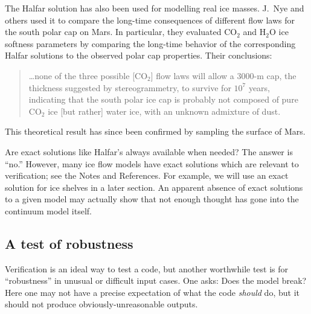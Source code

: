 \documentclass[letterpaper,final,12pt,reqno]{amsart}
\begin{document}
The Halfar solution has also been used for modelling real ice masses.  J.~Nye and others \cite{NyeIcarus2000} used it to compare the long-time consequences of different flow laws for the south polar cap on Mars.  In particular, they evaluated $\text{CO}_2$ and $\text{H}_2\text{O}$ ice softness parameters by comparing the long-time behavior of the corresponding Halfar solutions to the observed polar cap properties.  Their conclusions:
  \begin{quote}
  \dots none of the three possible [$\text{CO}_2$] flow laws will allow a 3000-m cap, the thickness suggested by stereogrammetry, to survive for $10^7$ years, indicating that the south polar ice cap is probably not composed of pure $\text{CO}_2$ ice [but rather] water ice, with an unknown admixture of dust.
  \end{quote}
This theoretical result has since been confirmed by sampling the surface of Mars.

Are exact solutions like Halfar's always available when needed?  The answer is ``no.''  However, many ice flow models have exact solutions which are relevant to verification; see the Notes and References.  For example, we will use an exact solution for ice shelves in a later section.  An apparent absence of exact solutions to a given model may actually show that not enough thought has gone into the continuum model itself.

\subsection*{A test of robustness}  Verification is an ideal way to test a code, but another worthwhile test is for ``robustness'' in unusual or difficult input cases.  One asks: Does the model break?  Here one may not have a precise expectation of what the code \emph{should} do, but it should not produce obviously-unreasonable outputs.
\end{document}
